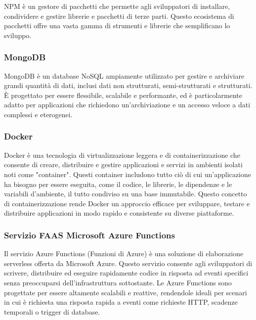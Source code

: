 \documentclass{scrartcl}
\begin{document}
NPM\cite{npm} è un gestore di pacchetti che permette agli sviluppatori di installare, condividere e gestire librerie e pacchetti di terze parti. Questo ecosistema di pacchetti offre una vasta gamma di strumenti e librerie che semplificano lo sviluppo.

\subsubsection{MongoDB}

MongoDB è un database NoSQL ampiamente utilizzato per gestire e archiviare grandi quantità di dati, inclusi dati non strutturati, semi-strutturati e strutturati. È progettato per essere flessibile, scalabile e performante, ed è particolarmente adatto per applicazioni che richiedono un'archiviazione e un accesso veloce a dati complessi e eterogenei.

\subsubsection{Docker}

Docker\cite{docker} è una tecnologia di virtualizzazione leggera e di containerizzazione che consente di creare, distribuire e gestire applicazioni e servizi in ambienti isolati noti come "container". Questi container includono tutto ciò di cui un'applicazione ha bisogno per essere eseguita, come il codice, le librerie, le dipendenze e le variabili d'ambiente, il tutto condiviso su una base immutabile. Questo concetto di containerizzazione rende Docker un approccio efficace per sviluppare, testare e distribuire applicazioni in modo rapido e consistente su diverse piattaforme.

\subsubsection{Servizio FAAS Microsoft Azure Functions}

Il servizio Azure Functions\cite{azurefunctions} (Funzioni di Azure) è una soluzione di elaborazione serverless offerta da Microsoft Azure\cite{microsoftazure}. Questo servizio consente agli sviluppatori di scrivere, distribuire ed eseguire rapidamente codice in risposta ad eventi specifici senza preoccuparsi dell'infrastruttura sottostante. Le Azure Functions sono progettate per essere altamente scalabili e reattive, rendendole ideali per scenari in cui è richiesta una risposta rapida a eventi come richieste HTTP, scadenze temporali o trigger di database.
\end{document}
